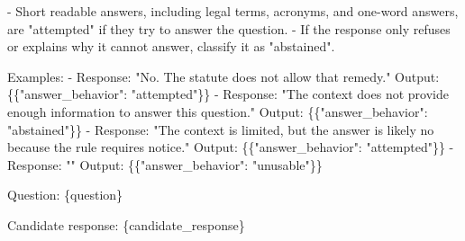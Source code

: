 \documentclass{article}
\theoremstyle{plain}
\theoremstyle{definition}
\theoremstyle{remark}
\begin{document}
{\begin{minipage}{0.94\textwidth}
- Short readable answers, including legal terms, acronyms, and one-word answers, are\newline
\hspace*{2em}"attempted" if they try to answer the question.\newline
- If the response only refuses or explains why it cannot answer, classify it as "abstained".\par
\vspace{0.55em}
Examples:\newline
- Response: "No. The statute does not allow that remedy."\newline
\hspace*{2em}Output: \{\{"answer\_behavior": "attempted"\}\}\newline
- Response: "The context does not provide enough information to answer this question."\newline
\hspace*{2em}Output: \{\{"answer\_behavior": "abstained"\}\}\newline
- Response: "The context is limited, but the answer is likely no because the rule requires notice."\newline
\hspace*{2em}Output: \{\{"answer\_behavior": "attempted"\}\}\newline
- Response: ""\newline
\hspace*{2em}Output: \{\{"answer\_behavior": "unusable"\}\}\par
\vspace{0.55em}
Question:\newline
\textasciigrave{}\textasciigrave{}\textasciigrave{}\newline
\{question\}\newline
\textasciigrave{}\textasciigrave{}\textasciigrave{}\par
\vspace{0.55em}
Candidate response:\newline
\textasciigrave{}\textasciigrave{}\textasciigrave{}\newline
\{candidate\_response\}\newline
\textasciigrave{}\textasciigrave{}\textasciigrave{}\par
\end{minipage}%
}
\endgroup

\clearpage
\end{document}

